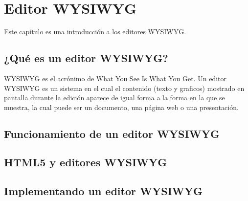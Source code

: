 \chapter{Editor WYSIWYG}

Este capítulo es una introducción a los editores WYSIWYG. 

\section{¿Qué es un editor WYSIWYG?}

WYSIWYG es el acrónimo de What You See Is What You Get. Un editor WYSIWYG es un sistema en el cual el contenido (texto y graficos) mostrado en pantalla durante la edición aparece de igual forma a la forma en la que se muestra, la cual puede ser un documento, una página web o una presentación.

\section{Funcionamiento de un editor WYSIWYG}


\section{HTML5 y editores WYSIWYG}


\section{Implementando un editor WYSIWYG}


